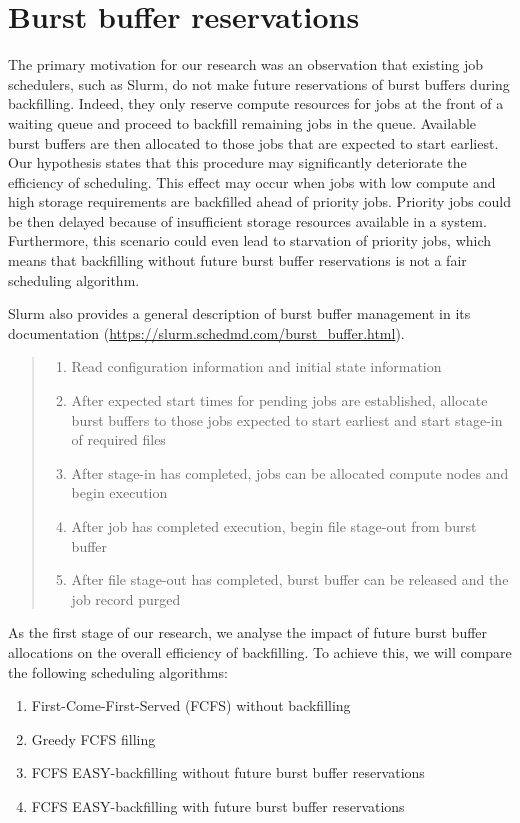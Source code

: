 \documentclass[thesis-en.tex]{subfiles}
\begin{document}
\section{Burst buffer reservations} \label{sec:canonical}
The primary motivation for our research was an observation that existing job schedulers, such as Slurm, do not make future reservations of burst buffers during backfilling. Indeed, they only reserve compute resources for jobs at the front of a waiting queue and proceed to backfill remaining jobs in the queue. Available burst buffers are then allocated to those jobs that are expected to start earliest. Our hypothesis states that this procedure may significantly deteriorate the efficiency of scheduling. This effect may occur when jobs with low compute and high storage requirements are backfilled ahead of priority jobs. Priority jobs could be then delayed because of insufficient storage resources available in a system. Furthermore, this scenario could even lead to starvation of priority jobs, which means that backfilling without future burst buffer reservations is not a fair scheduling algorithm.

Slurm also provides a general description of burst buffer management in its documentation (\url{https://slurm.schedmd.com/burst_buffer.html}).
\begin{quote}
\begin{enumerate}\addtocounter{enumi}{-1}
    \item Read configuration information and initial state information
    \item After expected start times for pending jobs are established, allocate burst buffers to those jobs expected to start earliest and start stage-in of required files
    \item After stage-in has completed, jobs can be allocated compute nodes and begin execution
    \item After job has completed execution, begin file stage-out from burst buffer
    \item After file stage-out has completed, burst buffer can be released and the job record purged
\end{enumerate}
\end{quote}

As the first stage of our research, we analyse the impact of future burst buffer allocations on the overall efficiency of backfilling. To achieve this, we will compare the following scheduling algorithms:
\begin{enumerate}
    \item First-Come-First-Served (FCFS) without backfilling
    \item Greedy FCFS filling
    \item FCFS EASY-backfilling without future burst buffer reservations
    \item FCFS EASY-backfilling with future burst buffer reservations
\end{enumerate}
\end{document}
